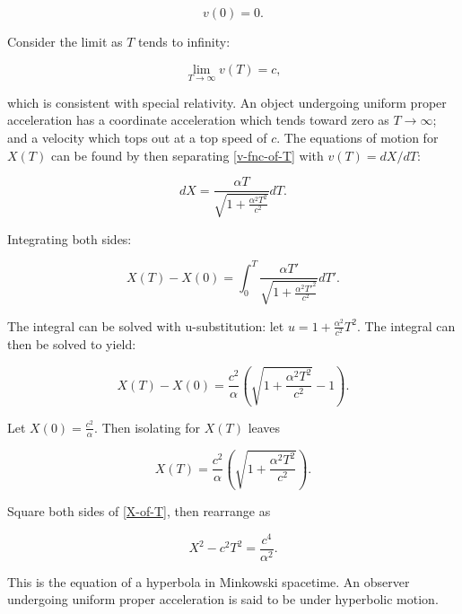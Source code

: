 \documentclass[11pt]{article}
\begin{document}
\begin{equation}
    \label{v-of-0}
    v(0) = 0.
\end{equation}

Consider the limit as $T$ tends to infinity:

\begin{equation}
    \label{v-limit}
    \lim_{T\to\infty} v(T) = c,
\end{equation}

which is consistent with special relativity. An object undergoing uniform proper acceleration has a coordinate acceleration which tends toward zero as $T \rightarrow \infty$; and a velocity which tops out at a top speed of $c$. The equations of motion for $X(T)$ can be found by then separating \eqref{v-fnc-of-T} with $v(T) = dX/dT$:

\begin{equation}
    \label{separable-X-of-T}
    dX = \frac{\alpha T}{\sqrt{1 + \frac{\alpha^2 T^2}{c^2}}} dT.
\end{equation}

Integrating both sides:

\begin{equation}
    \label{separable-X-of-T-integral}
    X(T) - X(0) = \int_0^T \frac{\alpha T'}{\sqrt{1 + \frac{\alpha^2 T'^2}{c^2}}} dT'.
\end{equation}

The integral can be solved with u-substitution: let $u = 1 + \frac{\alpha^2}{c^2}T^2$. The integral can then be solved to yield:

\begin{equation}
    \label{sol-X-of-T}
    X(T) - X(0) = \frac{c^2}{\alpha}\left(\sqrt{1 + \frac{\alpha^2 T^2}{c^2}} - 1 \right).
\end{equation}

Let $X(0) = \frac{c^2}{\alpha}$. Then isolating for $X(T)$ leaves

\begin{equation}
    \label{X-of-T}
    X(T) = \frac{c^2}{\alpha}\left(\sqrt{1 + \frac{\alpha^2 T^2}{c^2}}\right).
\end{equation}

Square both sides of \eqref{X-of-T}, then rearrange as

\begin{equation}
    \label{hyperbola-of-motion}
    X^2 - c^2T^2 = \frac{c^4}{\alpha^2}.
\end{equation}

This is the equation of a hyperbola in Minkowski spacetime. An observer undergoing uniform proper acceleration is said to be under hyperbolic motion.
\end{document}
